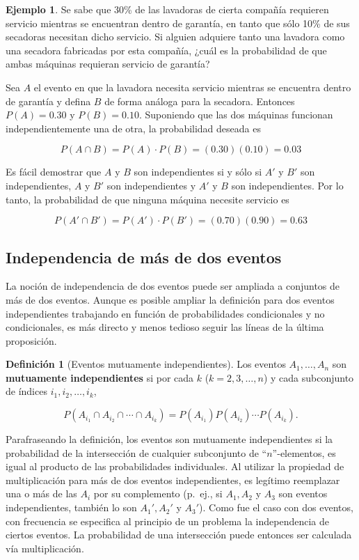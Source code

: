 \documentclass[
  11pt,
]{book}
\theoremstyle{definition}
\newtheorem{definition}{Definición}[chapter]
\theoremstyle{definition}
\newtheorem{example}{Ejemplo}[chapter]
\theoremstyle{definition}
\theoremstyle{definition}
\theoremstyle{remark}
\begin{document}
\begin{example}
Se sabe que 30\% de las lavadoras de cierta compañía requieren servicio mientras se encuentran dentro de garantía, en tanto que sólo 10\% de sus secadoras necesitan dicho servicio. Si alguien adquiere tanto una lavadora como una secadora fabricadas por esta compañía, ¿cuál es la probabilidad de que ambas máquinas requieran servicio de garantía?

Sea \(A\) el evento en que la lavadora necesita servicio mientras se encuentra dentro de garantía y defina \(B\) de forma análoga para la secadora. Entonces \(P(A) = 0.30\) y \(P(B) = 0.10\). Suponiendo que las dos máquinas funcionan independientemente una de otra, la probabilidad deseada es

\[
P(A \cap B) = P(A) \cdot P(B) = (0.30)(0.10) = 0.03
\]

Es fácil demostrar que \(A\) y \(B\) son independientes si y sólo si \(A'\) y \(B'\) son independientes, \(A\) y \(B'\) son independientes y \(A'\) y \(B\) son independientes. Por lo tanto, la probabilidad de que ninguna máquina necesite servicio es

\[
P(A' \cap B') = P(A') \cdot P(B') = (0.70)(0.90) = 0.63
\]
\end{example}

\subsection{Independencia de más de dos eventos}\label{independencia-de-muxe1s-de-dos-eventos}

La noción de independencia de dos eventos puede ser ampliada a conjuntos de más de dos eventos. Aunque es posible ampliar la definición para dos eventos independientes trabajando en función de probabilidades condicionales y no condicionales, es más directo y menos tedioso seguir las líneas de la última proposición.

\begin{definition}[Eventos mutuamente independientes]
Los eventos \(A_1, \ldots, A_n\) son \textbf{mutuamente independientes} si por cada \(k\) (\(k = 2, 3, \ldots, n\)) y cada subconjunto de índices \(i_1, i_2, \ldots, i_k\),

\[
P(A_{i_1} \cap A_{i_2} \cap \cdots \cap A_{i_k}) = P(A_{i_1}) P(A_{i_2}) \cdots P(A_{i_k}).
\]
\end{definition}

Parafraseando la definición, los eventos son mutuamente independientes si la probabilidad de la intersección de cualquier subconjunto de ``\(n\)''-elementos, es igual al producto de las probabilidades individuales. Al utilizar la propiedad de multiplicación para más de dos eventos independientes, es legítimo reemplazar una o más de las \(A_i\) por su complemento (p.~ej., si \(A_1, A_2\) y \(A_3\) son eventos independientes, también lo son \(A_1', A_2'\) y \(A_3'\)). Como fue el caso con dos eventos, con frecuencia se especifica al principio de un problema la independencia de ciertos eventos. La probabilidad de una intersección puede entonces ser calculada vía multiplicación.
\end{document}

